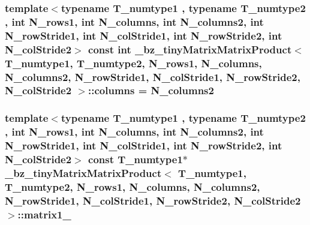 \subsubsection[{columns}]{\setlength{\rightskip}{0pt plus 5cm}template$<$typename T\+\_\+numtype1 , typename T\+\_\+numtype2 , int N\+\_\+rows1, int N\+\_\+columns, int N\+\_\+columns2, int N\+\_\+row\+Stride1, int N\+\_\+col\+Stride1, int N\+\_\+row\+Stride2, int N\+\_\+col\+Stride2$>$ const int {\bf \+\_\+bz\+\_\+tiny\+Matrix\+Matrix\+Product}$<$ T\+\_\+numtype1, T\+\_\+numtype2, N\+\_\+rows1, N\+\_\+columns, N\+\_\+columns2, N\+\_\+row\+Stride1, N\+\_\+col\+Stride1, N\+\_\+row\+Stride2, N\+\_\+col\+Stride2 $>$\+::columns = N\+\_\+columns2\hspace{0.3cm}{\ttfamily [static]}}\label{class__bz__tinyMatrixMatrixProduct_a2c8ab389609361dfe0e4e1440198994c}
\hypertarget{class__bz__tinyMatrixMatrixProduct_ac1c78ce70815739daf887f40d740238a}{}
\subsubsection[{matrix1\+\_\+}]{\setlength{\rightskip}{0pt plus 5cm}template$<$typename T\+\_\+numtype1 , typename T\+\_\+numtype2 , int N\+\_\+rows1, int N\+\_\+columns, int N\+\_\+columns2, int N\+\_\+row\+Stride1, int N\+\_\+col\+Stride1, int N\+\_\+row\+Stride2, int N\+\_\+col\+Stride2$>$ const T\+\_\+numtype1$\ast$ {\bf \+\_\+bz\+\_\+tiny\+Matrix\+Matrix\+Product}$<$ T\+\_\+numtype1, T\+\_\+numtype2, N\+\_\+rows1, N\+\_\+columns, N\+\_\+columns2, N\+\_\+row\+Stride1, N\+\_\+col\+Stride1, N\+\_\+row\+Stride2, N\+\_\+col\+Stride2 $>$\+::matrix1\+\_\+\hspace{0.3cm}{\ttfamily [protected]}}\label{class__bz__tinyMatrixMatrixProduct_ac1c78ce70815739daf887f40d740238a}
\hypertarget{class__bz__tinyMatrixMatrixProduct_a4626fdaee5660344f32f1a24ad58a910}{}
